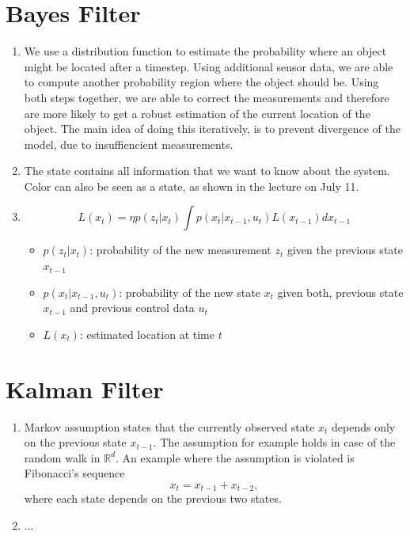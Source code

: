 \documentclass[12pt]{article}
\begin{document}
	\section*{Bayes Filter}
	\begin{enumerate}
		\item We use a distribution function to estimate the probability where an object might be located after a timestep. Using additional sensor data, we are able to compute another probability region where the object should be. Using both steps together, we are able to correct the measurements and therefore are more likely to get a robust estimation of the current location of the object. The main idea of doing this iteratively, is to prevent divergence of the model, due to insuffiencient measurements.
		\item The state contains all information that we want to know about the system. Color can also be seen as a state, as shown in the lecture on July 11.
		\item 
			\begin{equation*}
				L(x_t) = \eta p(z_t | x_t) \int p(x_t | x_{t - 1}, u_t) L(x_{t-1}) dx_{t-1}
			\end{equation*}
			\begin{itemize}
				\item $p(z_t | x_t)$: probability of the new measurement $z_t$ given the previous state $x_{t-1}$
				\item $p(x_t | x_{t - 1}, u_t)$: probability of the new state $x_t$ given both, previous state $x_{t-1}$ and previous control data $u_t$
				\item $L(x_t)$: estimated location at time $t$
			\end{itemize}
	\end{enumerate}

	\section*{Kalman Filter}
	\begin{enumerate}
		\item Markov assumption states that the currently observed state $x_t$ depends only on the previous state $x_{t-1}$. The assumption for example holds in case of the random walk in $\mathbb{R}^d$. An example where the assumption is violated is Fibonacci's sequence
		\begin{equation*}
			x_{t} = x_{t-1} + x_{t-2},
		\end{equation*}
		where each state depends on the previous two states.
		\item ...
	\end{enumerate}

%	
%	
\end{document}

